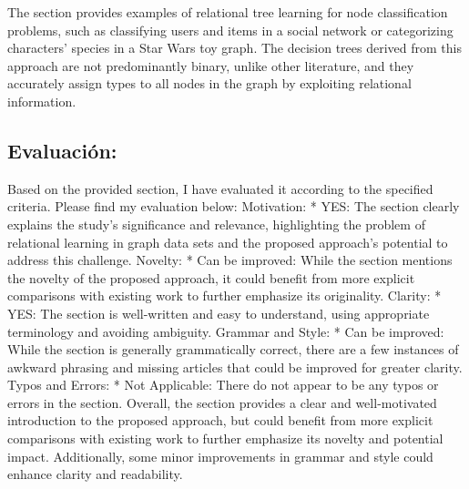 \documentclass{article}%
\begin{document}
The section provides examples of relational tree learning for node classification problems, such as classifying users and items in a social network or categorizing characters' species in a Star Wars toy graph. The decision trees derived from this approach are not predominantly binary, unlike other literature, and they accurately assign types to all nodes in the graph by exploiting relational information.

%
\subsection{Evaluación:}%
\label{subsec:Evaluacin}%
\newline%
Based on the provided section, I have evaluated it according to the specified criteria. Please find my evaluation below:\newline%
\newline%
Motivation:\newline%
\newline%
* YES: The section clearly explains the study's significance and relevance, highlighting the problem of relational learning in graph data sets and the proposed approach's potential to address this challenge.\newline%
\newline%
Novelty:\newline%
\newline%
* Can be improved: While the section mentions the novelty of the proposed approach, it could benefit from more explicit comparisons with existing work to further emphasize its originality.\newline%
\newline%
Clarity:\newline%
\newline%
* YES: The section is well{-}written and easy to understand, using appropriate terminology and avoiding ambiguity.\newline%
\newline%
Grammar and Style:\newline%
\newline%
* Can be improved: While the section is generally grammatically correct, there are a few instances of awkward phrasing and missing articles that could be improved for greater clarity.\newline%
\newline%
Typos and Errors:\newline%
\newline%
* Not Applicable: There do not appear to be any typos or errors in the section.\newline%
\newline%
Overall, the section provides a clear and well{-}motivated introduction to the proposed approach, but could benefit from more explicit comparisons with existing work to further emphasize its novelty and potential impact. Additionally, some minor improvements in grammar and style could enhance clarity and readability.
\end{document}

